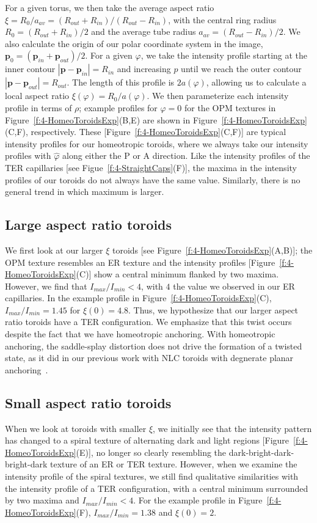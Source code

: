 For a given torus, we then take the average aspect ratio $\xi = R_0/a_{av} = (R_{out}+R_{in})/(R_{out}-R_{in})$, with the central ring radius $R_0=(R_{out}+R_{in})/2$ and the average tube radius $a_{av} = (R_{out}-R_{in})/2$.
We also calculate the origin of our polar coordinate system in the image, $\mathbf{p}_0 = (\mathbf{p}_{in}+\mathbf{p}_{out})/2$.
For a given $\varphi$, we take the intensity profile starting at the inner contour $|\mathbf{p}-\mathbf{p}_{in}| = R_{in}$ and increasing $p$ until we reach the outer contour $|\mathbf{p}-\mathbf{p}_{out}| = R_{out}$.
The length of this profile is $2 a(\varphi)$, allowing us to calculate a local aspect ratio $\xi(\varphi) = R_0/a(\varphi)$.
We then parameterize each intensity profile in terms of $\rho$; example profiles for $\varphi = 0$ for the OPM textures  in Figure~\ref{f:4-HomeoToroidsExp}(B,E) are shown in Figure~\ref{f:4-HomeoToroidsExp}(C,F), respectively.
These [Figure~\ref{f:4-HomeoToroidsExp}(C,F)] are typical intensity profiles for our homeotropic toroids, where we always take our intensity profiles with $\hat{\varphi}$ along either the P or A direction.
Like the intensity profiles of the TER capillaries [see Figue~\ref{f:4-StraightCaps}(F)], the maxima in the intensity profiles of our toroids do not always have the same value.
Similarly, there is no general trend in which maximum is larger.


\subsection{Large aspect ratio toroids}
We first look at our larger $\xi$ toroids [see Figure~\ref{f:4-HomeoToroidsExp}(A,B)]; the OPM texture resembles an ER texture and the intensity profiles [Figure~\ref{f:4-HomeoToroidsExp}(C)] show a central minimum flanked by two maxima.
However, we find that $I_{max}/I_{min} < 4$, with $4$ the value we observed in our ER capillaries.
In the example profile in Figure~\ref{f:4-HomeoToroidsExp}(C), $I_{max}/I_{min} = 1.45$ for $\xi(0) = 4.8$.
Thus, we hypothesize that our larger aspect ratio toroids have a TER configuration.
We emphasize that this twist occurs despite the fact that we have homeotropic anchoring.
With homeotropic anchoring, the saddle-splay distortion does not drive the formation of a twisted state, as it did in our previous work with NLC toroids with degnerate planar anchoring~\cite{RN24}.


\subsection{Small aspect ratio toroids}
When we look at toroids with smaller $\xi$, we initially see that the intensity pattern has changed to a spiral texture of alternating dark and light regions [Figure~\ref{f:4-HomeoToroidsExp}(E)], no longer so clearly resembling the dark-bright-dark-bright-dark texture of an ER or TER texture.
However, when we examine the intensity profile of the spiral textures, we still find qualitative similarities with the intensity profile of a TER configuration, with a central minimum surrounded by two maxima and $I_{max}/I_{min} < 4$.
For the example profile in Figure~\ref{f:4-HomeoToroidsExp}(F), $I_{max}/I_{min} =1.38$ and $\xi(0) = 2$.

